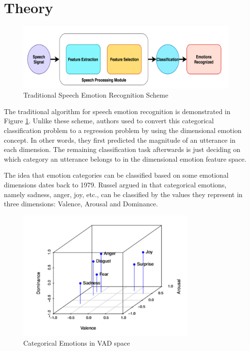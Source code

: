 \documentclass[a4paper,11pt]{article}
\begin{document}
\section{Theory} \label{sec:theory}

\begin{figure}[h]
    \centering
    \includegraphics[width=1\textwidth]{chart.png}
    \caption{Traditional Speech Emotion Recognition Scheme \cite{ser_deep_dl}}\label{fig:traditional}
\end{figure}

The traditional algorithm for speech emotion recognition is demonstrated in Figure \ref{fig:traditional}. Unlike these scheme, authors used to convert this categorical classification problem to a regression problem by using the dimensional emotion concept. In other words, they first predicted the magnitude of an utterance in each dimension. The remaining classification task afterwards is just deciding on which category an utterance belongs to in the dimensional emotion feature space. 

\pagebreak

The idea that emotion categories can be classified based on some emotional dimensions dates back to 1979. Russel argued in \cite{russell1979affective} that categorical emotions, namely sadness, anger, joy, etc., can be classified by the values they represent in three dimensions: Valence, Arousal and Dominance.

\begin{figure}[h]
\centering
\includegraphics[width=0.8\textwidth]{dimensions_pic.png}
\caption{Categorical Emotions in VAD space \cite{bualan2020emotion}}\label{fig:dimensions}
\end{figure}
\end{document}
